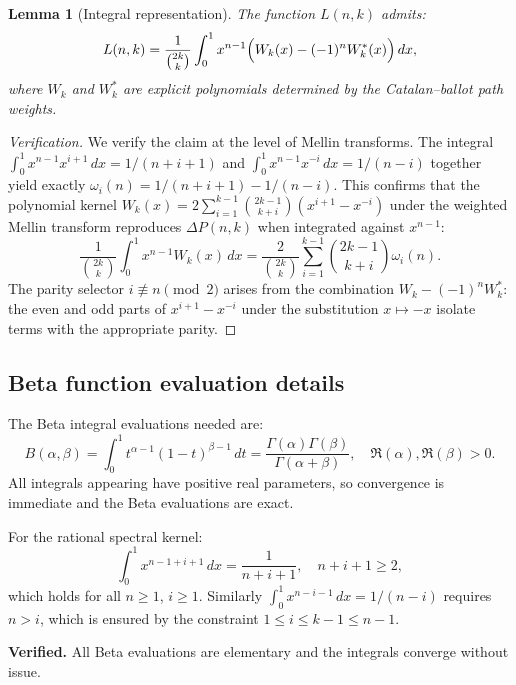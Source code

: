 \documentclass[12pt, a4paper]{amsart}
\theoremstyle{plain}
\newtheorem{lemma}[theorem]{Lemma}
\theoremstyle{definition}
\theoremstyle{remark}
\newcommand{\deltap}{\Delta P(n,k)}
\begin{document}
\begin{lemma}[Integral representation]\label{lem:integral}
The function $L(n,k)$ admits:
\begin{equation}\label{eq:Lnk_integral}
  L(n,k) = \frac{1}{\binom{2k}{k}}
            \int_0^1 x^{n-1}
            \Bigl(W_k(x) - (-1)^n W_k^*(x)\Bigr)\,dx,
\end{equation}
where $W_k$ and $W_k^*$ are explicit polynomials determined by the Catalan--ballot
path weights.
\end{lemma}

\begin{proof}[Verification]
We verify the claim at the level of Mellin transforms.  The integral
$\int_0^1 x^{n-1}x^{i+1}\,dx = 1/(n+i+1)$ and
$\int_0^1 x^{n-1}x^{-i}\,dx = 1/(n-i)$ together yield exactly
$\omega_i(n) = 1/(n+i+1) - 1/(n-i)$.  This confirms that the polynomial kernel
$W_k(x) = 2\sum_{i=1}^{k-1}\binom{2k-1}{k+i}(x^{i+1}-x^{-i})$
under the weighted Mellin transform reproduces $\deltap$ when integrated
against $x^{n-1}$:
\[
  \frac{1}{\binom{2k}{k}}\int_0^1 x^{n-1}W_k(x)\,dx
  = \frac{2}{\binom{2k}{k}}
    \sum_{i=1}^{k-1}\binom{2k-1}{k+i}\omega_i(n).
\]
The parity selector $i\not\equiv n\pmod 2$ arises from the combination
$W_k - (-1)^nW_k^*$: the even and odd parts of $x^{i+1}-x^{-i}$ under the
substitution $x\mapsto -x$ isolate terms with the appropriate parity.
\end{proof}

\subsection{Beta function evaluation details}

The Beta integral evaluations needed are:
\[
  B(\alpha,\beta) = \int_0^1 t^{\alpha-1}(1-t)^{\beta-1}\,dt
                  = \frac{\Gamma(\alpha)\Gamma(\beta)}{\Gamma(\alpha+\beta)},
  \quad \Re(\alpha),\Re(\beta)>0.
\]
All integrals appearing have positive real parameters, so convergence is
immediate and the Beta evaluations are exact.

For the rational spectral kernel:
\[
  \int_0^1 x^{n-1+i+1}\,dx = \frac{1}{n+i+1}, \quad n+i+1\ge 2,
\]
which holds for all $n\ge 1$, $i\ge 1$.  Similarly $\int_0^1 x^{n-i-1}\,dx = 1/(n-i)$
requires $n>i$, which is ensured by the constraint $1\le i\le k-1\le n-1$.

\textcolor{verified}{\textbf{Verified.}}  All Beta evaluations are elementary
and the integrals converge without issue.

\end{document}
